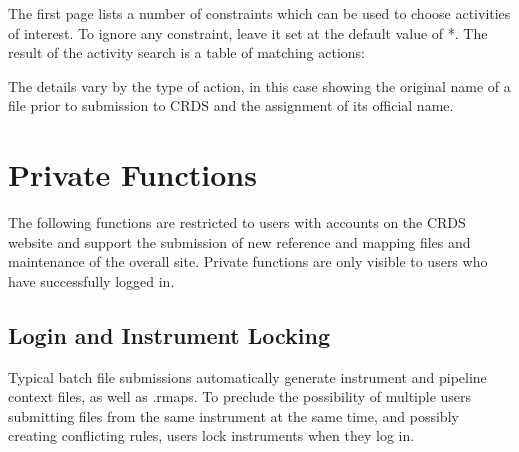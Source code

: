 \documentclass[letterpaper,10pt,english]{sphinxmanual}
\begin{document}
The first page lists a number of constraints which can be used to choose
activities of interest.   To ignore any constraint,  leave it set at the default
value of *.   The result of the activity search is a table of matching actions:
\begin{figure}[htbp]
\centering

\end{figure}

The details vary by the type of action,  in this case showing the original name
of a file prior to submission to CRDS and the assignment of its official name.


\section{Private Functions}
\label{web_site_use:private-functions}
The following functions are restricted to users with accounts on the CRDS website
and support the submission of new reference and mapping files and maintenance
of the overall site.   Private functions are only visible to users who have
successfully logged in.


\subsection{Login and Instrument Locking}
\label{web_site_use:login-and-instrument-locking}
Typical batch file submissions automatically generate instrument and pipeline context
files,  as well as .rmaps.   To preclude the possibility of multiple users submitting
files from the same instrument at the same time,  and possibly creating conflicting
rules,  users lock instruments when they log in.
\begin{figure}[htbp]
\centering

\end{figure}
\end{document}
